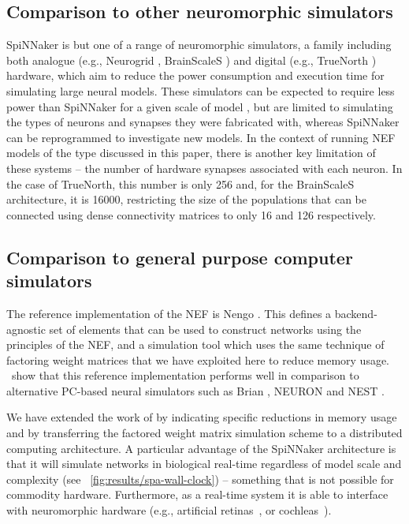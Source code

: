 \documentclass[conference]{IEEEtran}
\begin{document}
  \subsection{Comparison to other neuromorphic simulators}

  SpiNNaker is but one of a range of neuromorphic simulators, a family including both analogue (e.g., Neurogrid \parencite{Benjamin2014}, BrainScaleS \parencite{Schemmel2010}) and digital (e.g., TrueNorth \parencite{Merolla2014}) hardware, which aim to reduce the power consumption and execution time for simulating large neural models.
  These simulators can be expected to require less power than SpiNNaker for a given scale of model \parencite{Stromatias2013}, but are limited to simulating the types of neurons and synapses they were fabricated with, whereas SpiNNaker can be reprogrammed to investigate new models.
  In the context of running NEF models of the type discussed in this paper, there is another key limitation of these systems -- the number of hardware synapses associated with each neuron. In the case of TrueNorth, this number is only \num{256} and, for the BrainScaleS architecture, it is \num{16000}, restricting the size of the populations that can be connected using dense connectivity matrices to only 16 and 126 respectively.

  \subsection{Comparison to general purpose computer simulators}

  The reference implementation of the NEF is Nengo \parencite{Bekolay2014}.
  This defines a backend-agnostic set of elements that can be used to construct networks using the principles of the NEF, and a simulation tool which uses the same technique of factoring weight matrices that we have exploited here to reduce memory usage.
  \textcite*{Bekolay2014}\ show that this reference implementation performs well in comparison to alternative PC-based neural simulators such as Brian \parencite{Goodman2009}, NEURON \parencite{carnevale2006neuron} and NEST \parencite{Gewaltig2007}.

  We have extended the work of \citeauthor*{Bekolay2014} by indicating specific reductions in memory usage and by transferring the factored weight matrix simulation scheme to a distributed computing architecture.
  A particular advantage of the SpiNNaker architecture is that it will simulate networks in biological real-time regardless of model scale and complexity (see \figurename~\ref{fig:results/spa-wall-clock}) -- something that is not possible for commodity hardware.
  Furthermore, as a real-time system it is able to interface with neuromorphic hardware (e.g., artificial retinas~\parencite{Lichtensteiner2008}, or cochleas~\parencite{Chan2007}).
\end{document}
